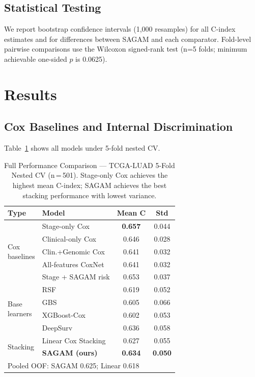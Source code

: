 \documentclass[conference]{IEEEtran}
\begin{document}
\subsection{Statistical Testing}

We report bootstrap confidence intervals (1,000 resamples) for all C-index
estimates and for differences between SAGAM and each comparator.
Fold-level pairwise comparisons use the Wilcoxon signed-rank test (n=5 folds;
minimum achievable one-sided $p$ is 0.0625).

\section{Results}

\subsection{Cox Baselines and Internal Discrimination}

Table~\ref{tab:baselines} shows all models under 5-fold nested CV.

\begin{table}[t]
\caption{Full Performance Comparison — TCGA-LUAD 5-Fold Nested CV
(n\,=\,501). Stage-only Cox achieves the highest mean C-index; SAGAM
achieves the best stacking performance with lowest variance.}
\label{tab:baselines}
\begin{center}
\begin{tabular}{llcc}
\toprule
\textbf{Type} & \textbf{Model} & \textbf{Mean C} & \textbf{Std} \\
\midrule
\multirow{5}{*}{\parbox{1cm}{Cox\\baselines}}
& Stage-only Cox & \textbf{0.657} & 0.044 \\
& Clinical-only Cox & 0.646 & 0.028 \\
& Clin.+Genomic Cox & 0.641 & 0.032 \\
& All-features CoxNet & 0.641 & 0.032 \\
& Stage + SAGAM risk & 0.653 & 0.037 \\
\midrule
\multirow{4}{*}{\parbox{1cm}{Base\\learners}}
& RSF~\cite{ishwaran2008random}        & 0.619 & 0.052 \\
& GBS~\cite{hothorn2006survival}       & 0.605 & 0.066 \\
& XGBoost-Cox~\cite{chen2016xgboost}   & 0.602 & 0.053 \\
& DeepSurv~\cite{katzman2018deepsurv}  & 0.636 & 0.058 \\
\midrule
\multirow{2}{*}{Stacking}
& Linear Cox Stacking    & 0.627 & 0.055 \\
& \textbf{SAGAM (ours)}  & \textbf{0.634} & \textbf{0.050} \\
\midrule
\multicolumn{4}{l}{\small Pooled OOF: SAGAM 0.625; Linear 0.618} \\
\bottomrule
\end{tabular}
\end{center}
\end{table}
\end{document}
